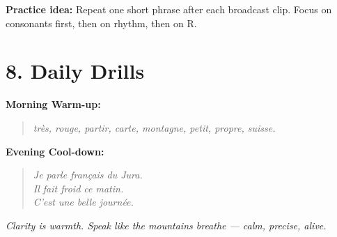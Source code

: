 \documentclass[11pt,a4paper]{article}
\begin{document}
\textbf{Practice idea:}
Repeat one short phrase after each broadcast clip. 
Focus on consonants first, then on rhythm, then on R.

\vspace{0.5em}

\section*{8. Daily Drills}

\textbf{Morning Warm-up:}
\begin{quote}
\textit{très, rouge, partir, carte, montagne, petit, propre, suisse.}
\end{quote}

\textbf{Evening Cool-down:}
\begin{quote}
\textit{Je parle français du Jura.}\\
\textit{Il fait froid ce matin.}\\
\textit{C’est une belle journée.}
\end{quote}

\vspace{1em}

\begin{center}
\textit{Clarity is warmth. Speak like the mountains breathe — calm, precise, alive.}
\end{center}
\end{document}
